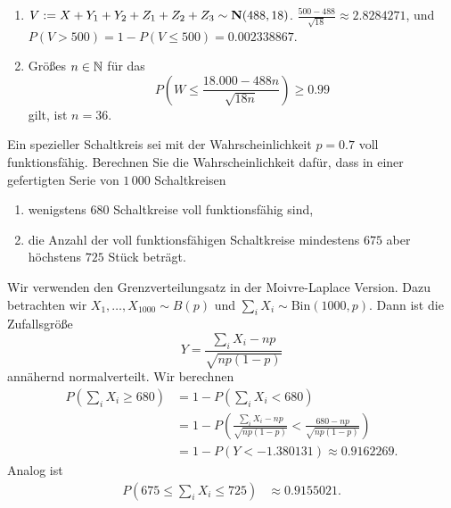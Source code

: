 \solution
\begin{enumerate}
    \item $V := X + Y_1 + Y_2 + Z_1+Z_2+Z_3 \sim  \mathbf N(488, 18)$. $\frac{500 -
        488}{\sqrt{18}} \approx 2.8284271$, und $P(V>500)= 1 - P(V\leq 500) =
        0.002338867$.
    \item Größes $n\in \mathbb N$ für das
        \begin{equation*}
            P\left( W \leq \frac{18.000 - 488 n }{\sqrt{18 n}} \right) \geq 0.99
        \end{equation*}
        gilt, ist $n=36$. 
\end{enumerate}


 Ein spezieller
Schaltkreis sei mit der Wahrscheinlichkeit $p=0.7$ voll funktionsfähig.
Berechnen Sie die Wahrscheinlichkeit dafür, dass in einer 
gefertigten Serie von $1\,000$ Schaltkreisen 
\begin{enumerate}
    \item wenigstens $680$ Schaltkreise voll funktionsfähig sind,

    \item die Anzahl der voll funktionsfähigen Schaltkreise mindestens
        $675$ aber höchstens $725$ Stück beträgt.
\end{enumerate}

\solution Wir verwenden den Grenzverteilungsatz in der
Moivre-Laplace Version.  Dazu betrachten wir $X_1,\dots ,X_{1000} \sim B(p)$
und $\sum_{i} X_i \sim \text{Bin}(1000,p)$.  Dann ist die Zufallsgröße
\begin{equation*}
    Y = \frac{ \sum_{i} X_i - np}{ \sqrt{np(1-p)} } 
\end{equation*}
annähernd normalverteilt. Wir berechnen
\begin{align*}
    P( \sum_{i} X_i \geq 680 ) &= 1 - P\left( \sum_{i} X_i < 680 \right) \\
    &= 1- P\left( \frac{\sum_{i} X_i - np }{\sqrt{np(1-p)}} < \frac{680-np}{\sqrt{np(1-p)}} \right)\\
    &= 1-P( Y < - 1.380131 ) \approx 0.9162269.
\end{align*}
Analog ist 
\begin{align*}
    P( 675 \leq \sum_{i} X_i \leq 725 ) &\approx 0.9155021.
\end{align*}

